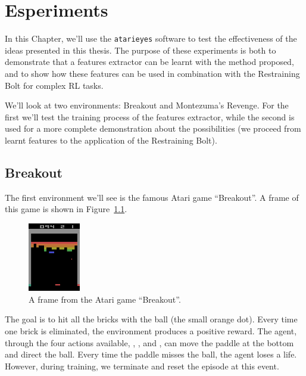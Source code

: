 \chapter{Esperiments}

\label{ch:experiments}

In this Chapter, we'll use the \texttt{atarieyes} software to test the
effectiveness of the ideas presented in this thesis. The purpose of these
experiments is both to demonstrate that a features extractor can be learnt
with the method proposed, and to show how these features can be used
in combination with the Restraining Bolt for complex RL tasks.

We'll look at two environments: Breakout and Montezuma's Revenge. For the
first we'll test the training process of the features extractor, while the
second is used for a more complete demonstration about the possibilities (we
proceed from learnt features to the application of the Restraining Bolt).

\let\sectionbreak\dontbreakhere

\section{Breakout}

\label{sec:exp-breakout}

The first environment we'll see is the famous Atari game ``Breakout''.
A frame of this game is shown in Figure~\ref{fig:breakout-frame}.
\begin{figure}
	\centering
	\includegraphics[height=3cm]{./imgs/br1.png}
	\caption{A frame from the Atari game ``Breakout''.}
	\label{fig:breakout-frame}
\end{figure}
The goal is to hit all the bricks with the ball (the small orange dot). Every
time one brick is eliminated, the environment produces a positive reward. The
agent, through the four actions available, , ,
 and , can move the paddle at the bottom and direct
the ball. Every time the paddle misses the ball, the agent loses a life.
However, during training, we terminate and reset the episode at this event.

